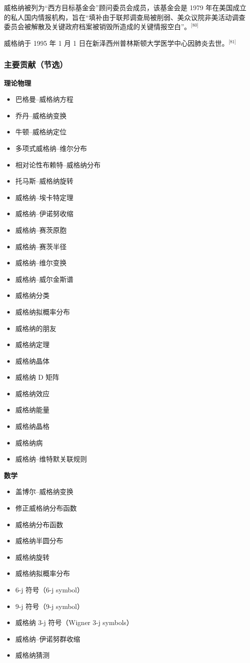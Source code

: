 威格纳被列为“西方目标基金会”顾问委员会成员，该基金会是 1979 年在美国成立的私人国内情报机构，旨在“填补由于联邦调查局被削弱、美众议院非美活动调查委员会被解散及关键政府档案被销毁所造成的关键情报空白”。\(^\text{[80]}\)

威格纳于 1995 年 1 月 1 日在新泽西州普林斯顿大学医学中心因肺炎去世。\(^\text{[81]}\)
\subsubsection{主要贡献（节选）}
\textbf{理论物理}
\begin{itemize}
\item 巴格曼–威格纳方程
\item 乔丹–威格纳变换
\item 牛顿–威格纳定位
\item 多项式威格纳–维尔分布
\item 相对论性布赖特–威格纳分布
\item 托马斯–威格纳旋转
\item 威格纳–埃卡特定理
\item 威格纳–伊诺努收缩
\item 威格纳–赛茨原胞
\item 威格纳–赛茨半径
\item 威格纳–维尔变换
\item 威格纳–威尔金斯谱
\item 威格纳分类
\item 威格纳拟概率分布
\item 威格纳的朋友
\item 威格纳定理
\item 威格纳晶体
\item 威格纳 D 矩阵
\item 威格纳效应
\item 威格纳能量
\item 威格纳晶格
\item 威格纳病
\item 威格纳–维特默关联规则
\end{itemize}
\textbf{数学}
\begin{itemize}
\item 盖博尔–威格纳变换
\item 修正威格纳分布函数
\item 威格纳分布函数
\item 威格纳半圆分布
\item 威格纳旋转
\item 威格纳拟概率分布
\item 6-j 符号（6-j symbol）
\item 9-j 符号（9-j symbol）
\item 威格纳 3-j 符号（Wigner 3-j symbols）
\item 威格纳–伊诺努群收缩
\item 威格纳猜测
\end{itemize}
